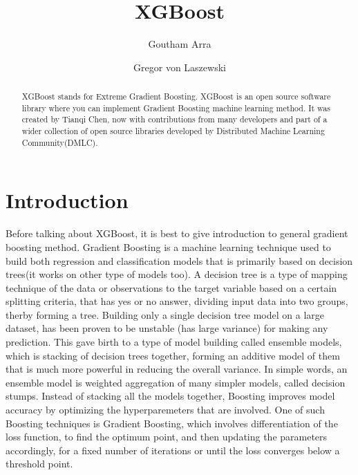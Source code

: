 
\title{XGBoost}


\author{Goutham Arra}

\author{Gregor von Laszewski}




\begin{abstract}  

XGBoost stands for Extreme Gradient Boosting. XGBoost is an open source software
library where you can  implement Gradient Boosting machine learning method. It
was created by Tianqi Chen, now with contributions from many developers and part
of a wider collection of open source libraries developed by Distributed Machine
Learning Community(DMLC).

\end{abstract}



\maketitle


\section{Introduction}  

Before talking about XGBoost, it is best to give introduction to general
gradient boosting method. Gradient Boosting is a machine learning technique
used to build both regression and classification models that is primarily
based on decision trees(it works on other type of models too). A decision tree
is a type of mapping technique of the data or observations to the target
variable based on a certain splitting criteria, that has yes or no answer,
dividing input data into two groups, therby forming a tree.  Building only a
single decision tree model on a large dataset, has been proven to be  unstable
(has large variance) for making any prediction. This gave birth to a type of
model building called ensemble models, which is stacking of decision trees
together, forming an additive model of them that is much more powerful in
reducing the overall variance. In simple words, an ensemble model is weighted
aggregation of many simpler models, called decision stumps. Instead of
stacking all the models together, Boosting improves model accuracy by
optimizing  the hyperparemeters that are involved. One of such Boosting
techniques is Gradient Boosting, which involves differentiation of the loss
function, to find the optimum point, and then updating the  parameters
accordingly, for a fixed number of iterations or until the loss converges
below a threshold point.

